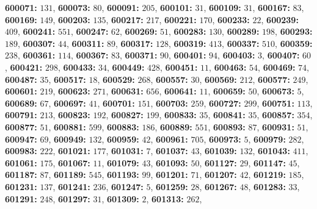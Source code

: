 \textsf{\bfseries 600071:} $131$, \textsf{\bfseries 600073:} $80$, \textsf{\bfseries 600091:} $205$, \textsf{\bfseries 600101:} $31$, \textsf{\bfseries 600109:} $31$, \textsf{\bfseries 600167:} $83$, \textsf{\bfseries 600169:} $149$, \textsf{\bfseries 600203:} $135$, \textsf{\bfseries 600217:} $217$, \textsf{\bfseries 600221:} $170$, \textsf{\bfseries 600233:} $22$, \textsf{\bfseries 600239:} $409$, \textsf{\bfseries 600241:} $551$, \textsf{\bfseries 600247:} $62$, \textsf{\bfseries 600269:} $51$, \textsf{\bfseries 600283:} $130$, \textsf{\bfseries 600289:} $198$, \textsf{\bfseries 600293:} $189$, \textsf{\bfseries 600307:} $44$, \textsf{\bfseries 600311:} $89$, \textsf{\bfseries 600317:} $128$, \textsf{\bfseries 600319:} $413$, \textsf{\bfseries 600337:} $510$, \textsf{\bfseries 600359:} $238$, \textsf{\bfseries 600361:} $114$, \textsf{\bfseries 600367:} $83$, \textsf{\bfseries 600371:} $90$, \textsf{\bfseries 600401:} $94$, \textsf{\bfseries 600403:} $3$, \textsf{\bfseries 600407:} $60$, \textsf{\bfseries 600421:} $298$, \textsf{\bfseries 600433:} $34$, \textsf{\bfseries 600449:} $428$, \textsf{\bfseries 600451:} $11$, \textsf{\bfseries 600463:} $54$, \textsf{\bfseries 600469:} $74$, \textsf{\bfseries 600487:} $35$, \textsf{\bfseries 600517:} $18$, \textsf{\bfseries 600529:} $268$, \textsf{\bfseries 600557:} $30$, \textsf{\bfseries 600569:} $212$, \textsf{\bfseries 600577:} $249$, \textsf{\bfseries 600601:} $219$, \textsf{\bfseries 600623:} $271$, \textsf{\bfseries 600631:} $656$, \textsf{\bfseries 600641:} $11$, \textsf{\bfseries 600659:} $50$, \textsf{\bfseries 600673:} $5$, \textsf{\bfseries 600689:} $67$, \textsf{\bfseries 600697:} $41$, \textsf{\bfseries 600701:} $151$, \textsf{\bfseries 600703:} $259$, \textsf{\bfseries 600727:} $299$, \textsf{\bfseries 600751:} $113$, \textsf{\bfseries 600791:} $213$, \textsf{\bfseries 600823:} $192$, \textsf{\bfseries 600827:} $199$, \textsf{\bfseries 600833:} $35$, \textsf{\bfseries 600841:} $35$, \textsf{\bfseries 600857:} $354$, \textsf{\bfseries 600877:} $51$, \textsf{\bfseries 600881:} $599$, \textsf{\bfseries 600883:} $186$, \textsf{\bfseries 600889:} $551$, \textsf{\bfseries 600893:} $87$, \textsf{\bfseries 600931:} $51$, \textsf{\bfseries 600947:} $69$, \textsf{\bfseries 600949:} $132$, \textsf{\bfseries 600959:} $42$, \textsf{\bfseries 600961:} $705$, \textsf{\bfseries 600973:} $5$, \textsf{\bfseries 600979:} $282$, \textsf{\bfseries 600983:} $222$, \textsf{\bfseries 601021:} $177$, \textsf{\bfseries 601031:} $7$, \textsf{\bfseries 601037:} $43$, \textsf{\bfseries 601039:} $132$, \textsf{\bfseries 601043:} $411$, \textsf{\bfseries 601061:} $175$, \textsf{\bfseries 601067:} $11$, \textsf{\bfseries 601079:} $43$, \textsf{\bfseries 601093:} $50$, \textsf{\bfseries 601127:} $29$, \textsf{\bfseries 601147:} $45$, \textsf{\bfseries 601187:} $87$, \textsf{\bfseries 601189:} $545$, \textsf{\bfseries 601193:} $99$, \textsf{\bfseries 601201:} $71$, \textsf{\bfseries 601207:} $42$, \textsf{\bfseries 601219:} $185$, \textsf{\bfseries 601231:} $137$, \textsf{\bfseries 601241:} $236$, \textsf{\bfseries 601247:} $5$, \textsf{\bfseries 601259:} $28$, \textsf{\bfseries 601267:} $48$, \textsf{\bfseries 601283:} $33$, \textsf{\bfseries 601291:} $248$, \textsf{\bfseries 601297:} $31$, \textsf{\bfseries 601309:} $2$, \textsf{\bfseries 601313:} $262$, 

